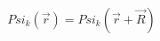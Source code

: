 \documentclass[preview]{standalone}
\begin{document}
\begin{align*}
Psi_k(\vec{r})= Psi_k(\vec{r}+\vec{R})
\end{align*}
\end{document}
